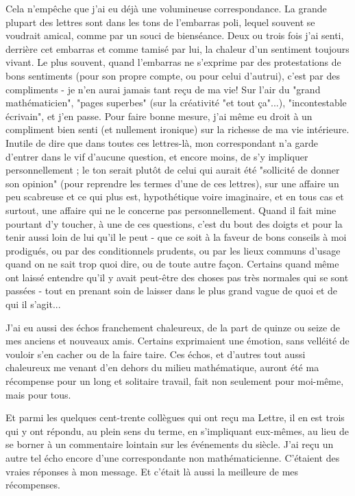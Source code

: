 Cela n'empêche que j'ai eu déjà une volumineuse correspondance. La grande plupart des lettres sont dans les tons de l'embarras poli, lequel souvent se voudrait amical, comme par un souci de bienséance. Deux ou trois fois j'ai senti, derrière cet embarras et comme tamisé par lui, la chaleur d'un sentiment toujours vivant. Le plus souvent, quand l'embarras ne s'exprime par des protestations de bons sentiments (pour son propre compte, ou pour celui d'autrui), c'est par des compliments - je n'en aurai jamais tant reçu de ma vie! Sur l'air du "grand mathématicien", "pages superbes" (sur la créativité "et tout ça"...), "incontestable écrivain", et j'en passe. Pour faire bonne mesure, j'ai même eu droit à un compliment bien senti (et nullement ironique) sur la richesse de ma vie intérieure. Inutile de dire que dans toutes ces lettres-là, mon correspondant n'a garde d'entrer dans le vif d'aucune question, et encore moins, de s'y impliquer personnellement ; le ton serait plutôt de celui qui aurait été "sollicité de donner son opinion" (pour reprendre les termes d'une de ces lettres), sur une affaire un peu scabreuse et ce qui plus est, hypothétique voire imaginaire, et en tous cas et surtout, une affaire qui ne le concerne pas personnellement. Quand il fait mine pourtant d'y toucher, à une de ces questions, c'est du bout des doigts et pour la tenir aussi loin de lui qu'il le peut - que ce soit à la faveur de bons conseils à moi prodigués, ou par des conditionnels prudents, ou par les lieux communs d'usage quand on ne sait trop quoi dire, ou de toute autre façon. Certains quand même ont laissé entendre qu'il y avait peut-être des choses pas très normales qui se sont passées - tout en prenant soin de laisser dans le plus grand vague de quoi et de qui il s'agit...

J'ai eu aussi des échos franchement chaleureux, de la part de quinze ou seize de mes anciens et nouveaux amis. Certains exprimaient une émotion, sans velléité de vouloir s'en cacher ou de la faire taire. Ces échos, et d'autres tout aussi chaleureux me venant d'en dehors du milieu mathématique, auront été ma récompense pour un long et solitaire travail, fait non seulement pour moi-même, mais pour tous.

Et parmi les quelques cent-trente collègues qui ont reçu ma Lettre, il en est trois qui y ont répondu, au plein sens du terme, en s'impliquant eux-mêmes, au lieu de se borner à un commentaire lointain sur les événements du siècle. J'ai reçu un autre tel écho encore d'une correspondante non mathématicienne. C'étaient des vraies réponses à mon message. Et c'était là aussi la meilleure de mes récompenses.

